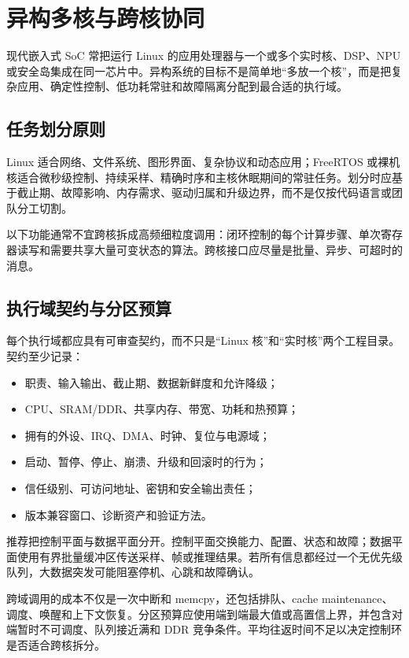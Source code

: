 \chapter{异构多核与跨核协同}
\label{chap:heterogeneous-multicore}

现代嵌入式 SoC 常把运行 Linux 的应用处理器与一个或多个实时核、DSP、NPU 或安全岛集成在同一芯片中。异构系统的目标不是简单地“多放一个核”，而是把复杂应用、确定性控制、低功耗常驻和故障隔离分配到最合适的执行域。

\section{任务划分原则}

Linux 适合网络、文件系统、图形界面、复杂协议和动态应用；FreeRTOS 或裸机核适合微秒级控制、持续采样、精确时序和主核休眠期间的常驻任务。划分时应基于截止期、故障影响、内存需求、驱动归属和升级边界，而不是仅按代码语言或团队分工切割。

以下功能通常不宜跨核拆成高频细粒度调用：闭环控制的每个计算步骤、单次寄存器读写和需要共享大量可变状态的算法。跨核接口应尽量是批量、异步、可超时的消息。

\section{执行域契约与分区预算}

每个执行域都应具有可审查契约，而不只是“Linux 核”和“实时核”两个工程目录。契约至少记录：
\begin{itemize}
  \item 职责、输入输出、截止期、数据新鲜度和允许降级；
  \item CPU、SRAM/DDR、共享内存、带宽、功耗和热预算；
  \item 拥有的外设、IRQ、DMA、时钟、复位与电源域；
  \item 启动、暂停、停止、崩溃、升级和回滚时的行为；
  \item 信任级别、可访问地址、密钥和安全输出责任；
  \item 版本兼容窗口、诊断资产和验证方法。
\end{itemize}

推荐把控制平面与数据平面分开。控制平面交换能力、配置、状态和故障；数据平面使用有界批量缓冲区传送采样、帧或推理结果。若所有信息都经过一个无优先级队列，大数据突发可能阻塞停机、心跳和故障确认。

跨域调用的成本不仅是一次中断和 memcpy，还包括排队、cache maintenance、调度、唤醒和上下文恢复。分区预算应使用端到端最大值或高置信上界，并包含对端暂时不可调度、队列接近满和 DDR 竞争条件。平均往返时间不足以决定控制环是否适合跨核拆分。

